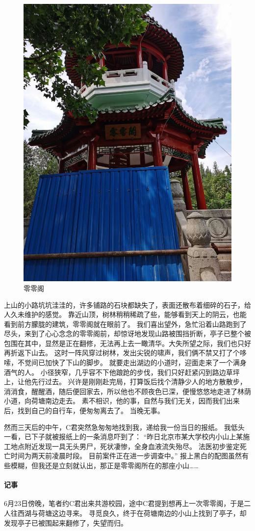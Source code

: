 \begin{figure}[!h]
	\centering
	\includegraphics[width=\linewidth]{figures/零零阁.jpg}
	零零阁
\end{figure}

上山的小路坑坑洼洼的，许多铺路的石块都缺失了，表面还散布着细碎的石子，给人久未维护的感觉。
靠近山顶，树林稍稍稀疏了些，能够看到天上的阴云，也能看到前方朦胧的建筑，零零阁就在眼前了。
我们喜出望外，急忙沿着山路跑到了尽头，来到了心心念念的零零阁前，却惊讶地发现山路被围挡折断，亭子已整个被包围在其中，显然是正在翻修，无法再上去一瞰清华。大失所望之际，我们也只好再折返下山去。
这时一阵风穿过树林，发出尖锐的啸声，我们俩不禁又打了个哆嗦，不觉间已加快了下山的脚步。
就要走出湖边的小道时，迎面走来了一个满身酒气的人。
小径狭窄，几乎容不下他踉跄的步伐，我们只好赶紧闪到路边草坪上，让他先行过去。
兴许是刚刚赴完局，打算饭后找个清静少人的地方散散步，消消食，醒醒酒，随后便回家去，所以他也不顾夜色已深，便慢悠悠地走进了林荫小道，向荷塘南边走去。
素不相识，他的事，自然与我们无关，因而我们出来后，找到自己的自行车，便匆匆离去了。
当晚无事。

然而三天后的中午，C君突然急匆匆地找到我，递给我一份当日的报纸。
我低头一看，已下子就被报纸上的一条消息吓到了：
“昨日北京市某大学校内小山上某施工地点附近发现一具无头男尸，死状凄惨，全身血液流失殆尽。
法医初步鉴定死亡时间为两天前凌晨时段。
目前案件正在进一步调查中。”
报上黑白的配图虽然有些模糊，但我还是立刻就认出，那正是零零阁所在的那座小山……

\vfill

\paragraph{记事}
6月23日傍晚，笔者约C君出来共游校园，途中C君提到想再上一次零零阁，于是二人往西湖与荷塘这边寻来。
寻觅良久，终于在荷塘南边的小山上找到了亭子，却发现亭子已被围起来翻修了，失望而归。
